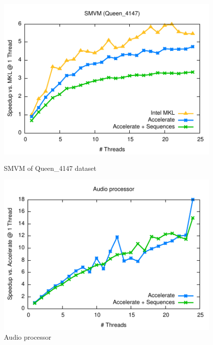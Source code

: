 \begin{figure}
  \centering
  \begin{minipage}{0.5\textwidth}%
    \includegraphics[width=\textwidth]{benchmarks/smvm/figs/smvm.pdf}
    \caption{SMVM of Queen\_4147 dataset}
    \label{fig:smvm_queen4147}
  \end{minipage}%
  \begin{minipage}{0.5\textwidth}%
    \includegraphics[width=\textwidth]{benchmarks/zero-crossings/figs/zero-crossings.pdf}
    \caption{Audio processor}
    \label{fig:zero-crossings}
  \end{minipage}
  \begin{minipage}{0.5\textwidth}%

\end{minipage}
\end{figure}
